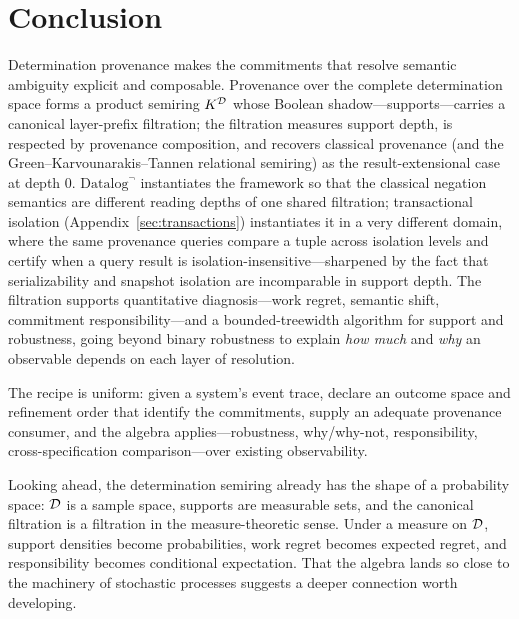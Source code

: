 \section{Conclusion}
\label{sec:conclusion}

Determination provenance makes the commitments that resolve semantic ambiguity
explicit and composable. Provenance over the complete determination space
forms a product semiring $K^{\mathcal{D}}$ whose Boolean shadow---supports---carries
a canonical layer-prefix filtration; the filtration measures support depth, is
respected by provenance composition, and recovers classical provenance (and
the Green--Karvounarakis--Tannen relational semiring) as the result-extensional
case at depth $0$. $\mbox{Datalog}^\neg$ instantiates the framework so that the
classical negation semantics are different reading depths of one shared
filtration; transactional isolation (Appendix~\ref{sec:transactions})
instantiates it in a very different domain, where the same provenance queries
compare a tuple across isolation levels and certify when a query result is
isolation-insensitive---sharpened by the fact that serializability and snapshot
isolation are incomparable in support depth. The filtration supports quantitative diagnosis---work regret, semantic
shift, commitment responsibility---and a bounded-treewidth algorithm for
support and robustness, going beyond binary robustness to explain \emph{how
much} and \emph{why} an observable depends on each layer of resolution.

The recipe is uniform: given a system's event trace, declare an outcome space
and refinement order that identify the commitments, supply an adequate
provenance consumer, and the algebra applies---robustness, why/why-not,
responsibility, cross-specification comparison---over existing observability.

Looking ahead, the determination semiring already has the shape of a
probability space: $\mathcal{D}$ is a sample space, supports are measurable sets,
and the canonical filtration is a filtration in the measure-theoretic sense.
Under a measure on $\mathcal{D}$, support densities become probabilities, work
regret becomes expected regret, and responsibility becomes conditional
expectation. That the algebra lands so close to the machinery of stochastic
processes suggests a deeper connection worth developing.

